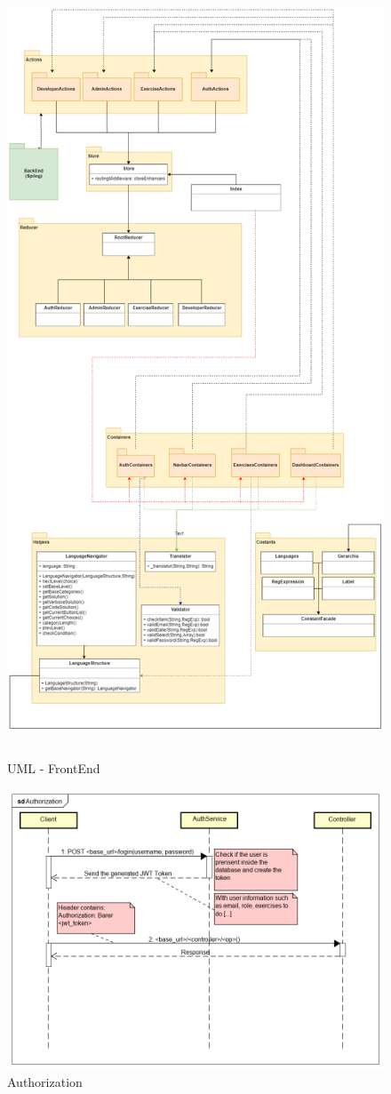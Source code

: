 \begin{figure}[H]
\centering
\includegraphics[width=18cm, height=23cm]{img/ReactSpec1.png} 
\caption{UML - FrontEnd}
\end{figure}

\begin{figure}[H]
\centering
\includegraphics[width=17cm, keepaspectratio]{img/Authorization.png} 
\caption{Authorization}
\end{figure}